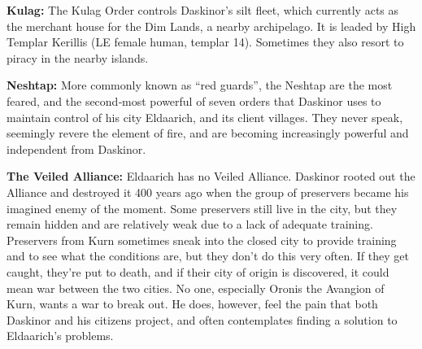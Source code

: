 {
\textbf{Kulag:} The Kulag Order controls Daskinor's silt fleet, which currently acts as the merchant house for the Dim Lands, a nearby archipelago. It is leaded by High Templar Kerillis (LE female human, templar 14). Sometimes they also resort to piracy in the nearby islands.

\textbf{Neshtap:} More commonly known as “red guards”, the Neshtap are the most feared, and the second‐most powerful of seven orders that Daskinor uses to maintain control of his city Eldaarich, and its client villages. They never speak, seemingly revere the element of fire, and are becoming increasingly powerful and independent from Daskinor.

\textbf{The Veiled Alliance:} Eldaarich has no Veiled Alliance. Daskinor rooted out the Alliance and destroyed it 400 years ago when the group of preservers became his imagined enemy of the moment. Some preservers still live in the city, but they remain hidden and are relatively weak due to a lack of adequate training. Preservers from Kurn sometimes sneak into the closed city to provide training and to see what the conditions are, but they don't do this very often. If they get caught, they're put to death, and if their city of origin is discovered, it could mean war between the two cities. No one, especially Oronis the Avangion of Kurn, wants a war to break out. He does, however, feel the pain that both Daskinor and his citizens project, and often contemplates finding a solution to Eldaarich's problems.
}
{}{}
